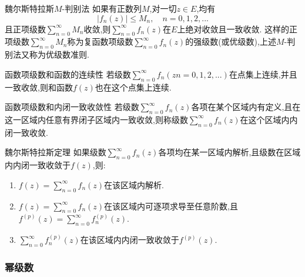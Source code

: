 \documentclass[zihao=-4,a4paper]{ctexart}
\begin{document}
\begin{mtheorem}{魏尔斯特拉斯$M$-判别法}
	如果有正数列$M$,对一切${z} {\in} {E}$,均有
	\begin{equation}
		\left| {f}_{n} \left( {z} \right) \right| {\leqslant} {M}_{n} , {\quad} n = 0 , 1 , 2 , ...	
	\end{equation}
	且正项级数$\sum^{\infty}_{n=0} {M}_{n}$收敛,则$\sum^{\infty}_{n=0} {f}_{n} \left( {z} \right)$在$E$上绝对收敛且一致收敛.
	这样的正项级数$\sum^{\infty}_{n=0} {M}_{n}$称为复函数项级数$\sum^{\infty}_{n=0} {f}_{n} \left( {z} \right)$的强级数(或优级数),上述$M$-判别法又称为优级数准则.
\end{mtheorem}

\begin{mtheorem}{函数项级数和函数的连续性}
	若级数$\sum^{\infty}_{n=0} {f}_{n} \left( {zn} = 0 , 1 , 2 , ... \right)$在点集上连续,并且一致收敛,则和函数${f} \left( {z} \right)$也在这个点集上连续.
\end{mtheorem}

\begin{mtheorem}{函数项级数和内闭一致收敛性}
	若级数$\sum^{\infty}_{n=0} {f}_{n} \left( {z} \right)$各项在某个区域内有定义,且在这一区域内任意有界闭子区域内一致收敛,则称级数$\sum^{\infty}_{n=0} {f}_{n} \left( {z} \right)$在这个区域内内闭一致收敛.
\end{mtheorem}

\begin{mtheorem}{魏尔斯特拉斯定理}
	如果级数$\sum^{\infty}_{n=0} {f}_{n} \left( {z} \right)$各项均在某一区域内解析,且级数在区域内内闭一致收敛于${f} \left( {z} \right)$,则:
	\begin{enumerate}
		\item ${f} \left( {z} \right) = \sum^{\infty}_{n=0} {f}_{n} \left( {z} \right)$在该区域内解析.
		\item ${f} \left( {z} \right) = \sum^{\infty}_{n=0} {f}_{n} \left( {z} \right)$在该区域内可逐项求导至任意阶数,且${f}^{\left( {p} \right)} \left( {z} \right) = \sum^{\infty}_{n=0} {f}^{\left( {p} \right)}_{n} \left( {z} \right)$.
		\item $\sum^{\infty}_{n=0} {f}^{\left( {p} \right)}_{n} \left( {z} \right)$在该区域内内闭一致收敛于${f}^{\left( {p} \right)} \left( {z} \right)$.
	\end{enumerate}
\end{mtheorem}

\subsubsection{幂级数}
\end{document}
